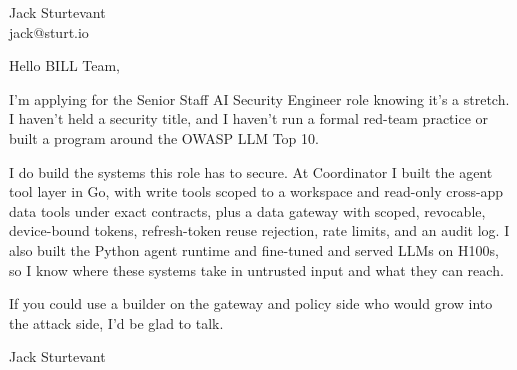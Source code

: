 \documentclass[11pt]{article}
\begin{document}
\raggedright

{\namefont\fontsize{20pt}{24pt}\selectfont Jack Sturtevant}\\[-0.3em]
jack@sturt.io

\vspace{1.2em}

Hello BILL Team,

I'm applying for the Senior Staff AI Security Engineer role knowing it's a stretch. I haven't held a security title, and I haven't run a formal red-team practice or built a program around the OWASP LLM Top 10.

I do build the systems this role has to secure. At Coordinator I built the agent tool layer in Go, with write tools scoped to a workspace and read-only cross-app data tools under exact contracts, plus a data gateway with scoped, revocable, device-bound tokens, refresh-token reuse rejection, rate limits, and an audit log. I also built the Python agent runtime and fine-tuned and served LLMs on H100s, so I know where these systems take in untrusted input and what they can reach.

If you could use a builder on the gateway and policy side who would grow into the attack side, I'd be glad to talk.

\vspace{0.6em}
Jack Sturtevant
\end{document}
